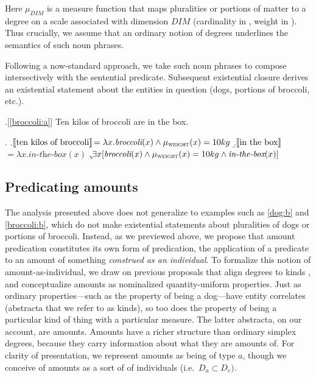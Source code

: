 \documentclass[a4paper,12pt,twoside]{article}
\newcommand{\sv}[1]{\ensuremath{\llbracket\textnormal{#1}\rrbracket}}
\newcommand{\red}[1]{\textcolor{red}{\sffamily#1}}
\begin{document}
	Here $\mu_{DIM}$ is a measure function that maps pluralities or portions of matter to a degree on a scale associated with dimension $DIM$ (cardinality in \Last[a], weight in \Last[b]). Thus crucially, we assume that an ordinary notion of degrees underlines the semantics of such noun phrases.
	
	Following a now-standard approach, we take such noun phrases to compose intersectively with the sentential predicate. Subsequent existential closure derives an existential statement about the entities in question (dogs, portions of broccoli, etc.).   
	
	\ex.[\ref{broccoli:a}]\label{ind} Ten kilos of broccoli are in the box.
    
	\ex.
    \a.\label{ind:a}\sv{ten kilos of broccoli}$=\lambda x.\textit{broccoli}(x) \wedge \mu_{\textsc{weight}}(x) = 10kg$ 
	\b.\label{ind:b}\sv{in the box}$=\lambda x.\textit{in-the-box}(x)$
	\c.\label{ind:c}$\exists x[\textit{broccoli}(x) \wedge \mu_{\textsc{weight}}(x) = 10kg \wedge \textit{in-the-box}(x) ]$
	
	
	
	\subsection{Predicating amounts}
	
	
	The analysis presented above  does not generalize to  examples such as  \ref{dog:b} and \ref{broccoli:b}, which do not make existential statements about  pluralities of dogs or portions of broccoli. Instead, as we previewed above, we propose  that amount predication constitutes its own form of predication, the application of a predicate to an amount of something \textit{construed as an individual}. To formalize this notion of amount-as-individual, we draw on previous proposals that align degrees to kinds \citep{Anderson&Morzycki:2015, Rothstein:2017, Scontras:2017}, and conceptualize amounts as nominalized quantity-uniform properties.   Just as ordinary properties---such as the property of being a dog---have entity correlates (abstracta that we refer to as kinds), so too does the property of being a particular kind of thing with a particular measure. The latter abstracta, on our account, are amounts. Amounts have a richer structure than ordinary simplex degrees, because they carry information about what they are amounts of. For clarity of presentation, we represent amounts as being of type $a$, though we conceive of amounts as a sort of of individuals (i.e.\ $D_a \subset D_e).$
	
\end{document}
